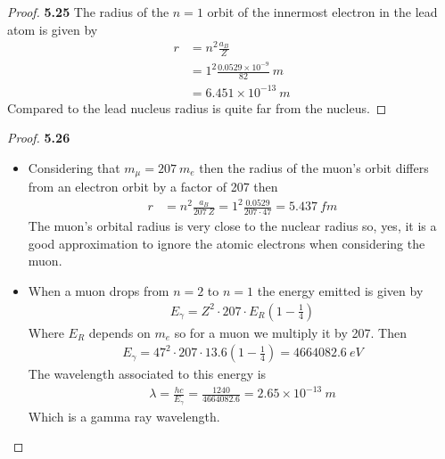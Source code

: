 \documentclass[11pt]{article}
\theoremstyle{definition}
\begin{document}
\cleardoublepage
\begin{proof}{\textbf{5.25}}
    The radius of the $n = 1$ orbit of the innermost electron in the lead atom
    is given by
    \begin{align*}
        r &= n^2\frac{a_B}{Z}\\
        &= 1^2\frac{0.0529 \times 10^{-9}}{82}~m\\
        &= 6.451 \times 10^{-13}~m
    \end{align*}
    Compared to the lead nucleus radius is quite far from the nucleus.
\end{proof}
\begin{proof}{\textbf{5.26}}
\begin{itemize}
    \item [(a)] Considering that $m_\mu = 207~m_e$ then the radius of the
    muon's orbit differs from an electron orbit by a factor of 207 then
    \begin{align*}
        r &= n^2\frac{a_B}{207~Z}
        = 1^2 \frac{0.0529}{207 \cdot 47}
        = 5.437~fm
    \end{align*}
    The muon's orbital radius is very close to the nuclear radius so, yes,
    it is a good approximation to ignore the atomic electrons when considering
    the muon.
    \item [(b)] When a muon drops from $n = 2$ to $n = 1$ the energy emitted is
    given by
    \begin{align*}
        E_\gamma = Z^2 \cdot 207\cdot E_R\left(1 - \frac{1}{4}\right)
    \end{align*}
    Where $E_R$ depends on $m_e$ so for a muon we multiply it by 207. Then
    \begin{align*}
        E_\gamma = 47^2 \cdot 207\cdot 13.6\left(1 - \frac{1}{4}\right)
        = 4664082.6 ~eV
    \end{align*}
    The wavelength associated to this energy is
    \begin{align*}
        \lambda = \frac{hc}{E_\gamma} = \frac{1240}{4664082.6}
        = 2.65 \times 10^{-13}~m
    \end{align*}
    Which is a gamma ray wavelength.
\end{itemize}
\end{proof}
\cleardoublepage
\end{document}
